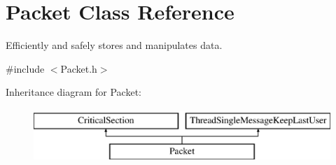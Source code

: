 \hypertarget{class_packet}{
\section{Packet Class Reference}
\label{class_packet}
}


Efficiently and safely stores and manipulates data.  




{\ttfamily \#include $<$Packet.h$>$}

Inheritance diagram for Packet:\begin{figure}[H]
\begin{center}
\leavevmode
\includegraphics[height=2.000000cm]{class_packet}
\end{center}
\end{figure}
